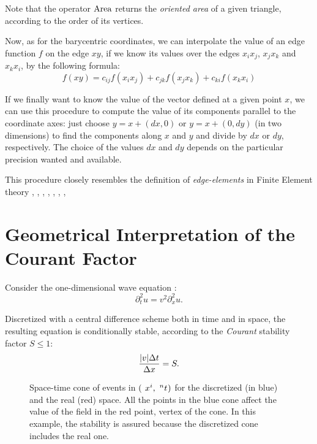 Note that the operator $\Area$ returns the \emph{oriented area} of a
given triangle, according to the order of its vertices.

Now, as for the barycentric coordinates, we can interpolate the value
of an edge function $f$ on the edge $xy$, if we know its values over
the edges $x_i x_j$, $x_j x_k$ and $x_k x_i$, by the following
formula:
\begin{equation*}
f\left(xy\right) = c_{ij} f\left(x_i x_j\right) + c_{jk} f\left(x_j x_k\right) + c_{ki} f\left(x_k x_i\right)
\end{equation*}

If we finally want to know the value of the vector defined at a given
point $x$, we can use this procedure to compute the value of its
components parallel to the coordinate axes: just choose $y = x + (dx,0)$
or $y = x + (0,dy)$ (in two dimensions) to find the components along $x$ and $y$
and divide by $dx$ or $dy$, respectively. The choice of the values
$dx$ and $dy$ depends on the particular precision wanted and
available.

This procedure closely resembles the definition of
\emph{edge-elements} in Finite Element theory
\cite{bossavit_edge}, \cite{lee_whitney}, \cite{webb_edge},
\cite{bossavit_how}, \cite{lee_time_domain}, \cite{sun_construction},
\cite{webb_hierarchal}, \cite{bossavit_yee}


\chapter{Geometrical Interpretation of the Courant Factor}
 \label{app:courant}

Consider the one-dimensional wave equation \cite{numerical_recipies}:
\begin{equation*}
  \partial_t^2 u = v^2 \partial_x^2 u .
\end{equation*}

Discretized with a central difference scheme both in time and in
space, the resulting equation is conditionally stable, according to
the \emph{Courant} stability factor $S \leq 1$:
\begin{equation*}
  \frac{\Abs{v}\deltat}{\deltax} = S .
\end{equation*}

\begin{figure}[htbp]
  \begin{center}
    \resizebox{8cm}{!}{}
  \end{center}
  \caption{Space-time cone of events in $(\Disc{x}{i}{},
    \Disc{t}{}{n})$ for the discretized (in blue) and the real
    (red) space. All the points in the blue cone affect the value of
    the field in the red point, vertex of the cone. In this example, the
    stability is assured because the discretized cone includes the
    real one.}
  \label{fig:space_time_cone}
\end{figure}

